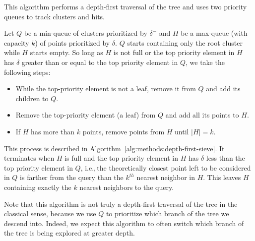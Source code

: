 This algorithm performs a depth-first traversal of the tree and uses two priority queues to track clusters and hits.

Let $Q$ be a min-queue of clusters prioritized by $\delta^{-}$ and $H$ be a max-queue (with capacity $k$) of points prioritized by $\delta$.
$Q$ starts containing only the root cluster while $H$ starts empty.
So long as $H$ is not full or the top priority element in $H$ has $\delta$ greater than or equal to the top priority element in $Q$, we take the following steps:

\begin{itemize}
    \item While the top-priority element is not a leaf, remove it from $Q$ and add its children to $Q$.
    \item Remove the top-priority element (a leaf) from $Q$ and add all its points to $H$.
    \item If $H$ has more than $k$ points, remove points from $H$ until $|H| = k$.
\end{itemize}

This process is described in Algorithm~\ref{alg:methods:depth-first-sieve}.
It terminates when $H$ is full and the top priority element in $H$ has $\delta$ less than the top priority element in $Q$, i.e.,\,the theoretically closest point left to be considered in $Q$ is farther from the query than the $k^{th}$ nearest neighbor in $H$.
This leaves $H$ containing exactly the $k$ nearest neighbors to the query.

Note that this algorithm is not truly a depth-first traversal of the tree in the classical sense, because we use $Q$ to prioritize which branch of the tree we descend into.
Indeed, we expect this algorithm to often switch which branch of the tree is being explored at greater depth.

